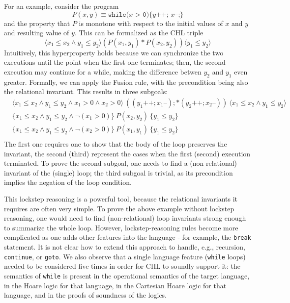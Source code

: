 For an example, consider the program
\begin{equation}\label{eqn:CounterProgram}
P(x,y) \equiv \texttt{while(}x\texttt{ > 0)\{ }y\texttt{++; }x\texttt{--;\}}
\end{equation}
and the property that $P$ is monotone with respect to the initial values of $x$ and $y$ and resulting value of $y$.
This can be formalized as the CHL triple
\begin{equation*}
\langle x_1 \leq x_2 \land y_1 \leq y_2  \rangle (P(x_1, y_1) * P(x_2, y_2)) \langle y_1 \leq y_2 \rangle
\end{equation*}
Intuitively, this hyperproperty holds because we can synchronize the two executions until the point when the first one terminates;
then, the second execution may continue for a while, making the difference betwen $y_2$ and $y_1$ even greater.
Formally, we can apply the Fusion rule, with the precondition being also the relational invariant.
This results in three subgoals:
\begin{equation*}
    \begin{aligned}
        & \langle x_1 \leq x_2 \land y_1 \leq y_2 \land x_1 > 0 \land x_2 > 0  \rangle\ ( (y_1\texttt{++} ; x_1\texttt{--}); * (y_2\texttt{++} ; x_2\texttt{--}))\ \langle x_1 \leq x_2 \land y_1 \leq y_2 \rangle \\
        & \{ x_1 \leq x_2 \land y_1 \leq y_2 \land \neg (x_1 > 0) \}\ P(x_2, y_2)\ \{ y_1 \leq y_2 \} \\
        & \{ x_1 \leq x_2 \land y_1 \leq y_2 \land \neg (x_2 > 0) \}\ P(x_1, y_1)\ \{ y_1 \leq y_2 \} \\
    \end{aligned}
\end{equation*}
The first one requires one to show that the body of the loop preserves the invariant,
the second (third) represent the cases when the first (second) execution terminated.
To prove the second subgoal, one needs to find a (non-relational) invariant of the (single) loop;
the third subgoal is trivial, as its precondition implies the negation of the loop condition.

This lockstep reasoning is a powerful tool, because the relational invariants it requires are often very simple.
To prove the above example without lockstep reasoning, one would need to find (non-relational) loop invariants
strong enough to summarize the whole loop.
However, lockstep-reasoning rules become more complicated as one adds other features into the language
- for example, the \texttt{break} statement.
It is not clear how to extend this approach to handle, e.g., recursion, \texttt{continue}, or \texttt{goto}.
We also observe that a single language feature (\texttt{while} loops) needed to be considered five times
in order for CHL to soundly support it: the semantics of \texttt{while} is present in the operational semantics of
the target language, in the Hoare logic for that language, in the Cartesian Hoare logic for that language,
and in the proofs of soundness of the logics.


